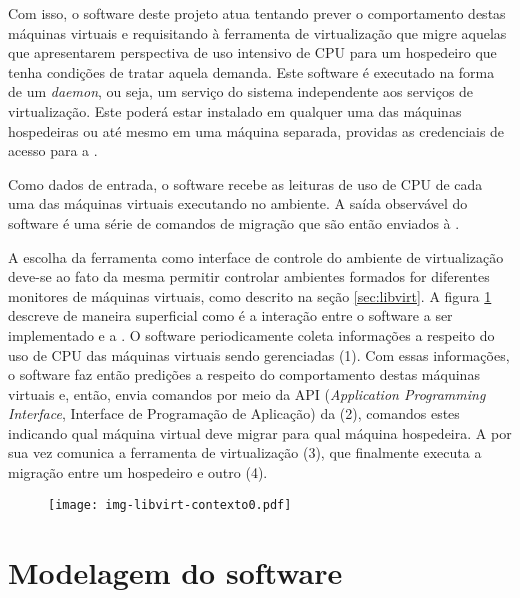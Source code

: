 Com isso, o software deste projeto atua tentando prever o comportamento
destas máquinas virtuais e requisitando à ferramenta de virtualização que
migre aquelas que apresentarem perspectiva de uso intensivo de CPU para um
hospedeiro que tenha condições de tratar aquela demanda. Este software é
executado na forma de um \emph{daemon}, ou seja, um serviço do sistema
independente aos serviços de virtualização. Este poderá estar instalado em
qualquer uma das máquinas hospedeiras ou até mesmo em uma máquina separada,
providas as credenciais de acesso para a \libvirt{}.

Como dados de entrada, o software recebe as leituras de uso de CPU de cada
uma das máquinas virtuais executando no ambiente. A saída observável do
software é uma série de comandos de migração que são então enviados à
\libvirt{}.

A escolha da ferramenta \libvirt{} como interface de controle do ambiente
de virtualização deve-se ao fato da mesma permitir controlar ambientes
formados for diferentes monitores de máquinas virtuais, como descrito na
seção \ref{sec:libvirt}. A figura \ref{fig:libvirtcontexto0} descreve de maneira
superficial como é a interação entre o software a ser implementado e a
\libvirt{}. O software periodicamente coleta informações a respeito
do uso de CPU das máquinas virtuais sendo gerenciadas (1). Com essas
informações, o software faz então predições a respeito do comportamento destas
máquinas virtuais e, então, envia comandos por meio da API (\emph{Application
Programming Interface}, Interface de Programação de Aplicação) da \libvirt{}
(2), comandos estes indicando qual máquina virtual deve migrar para qual
máquina hospedeira. A \libvirt{} por sua vez comunica a ferramenta de
virtualização (3), que finalmente executa a migração entre um hospedeiro e
outro (4).

\begin{figure}[htp]
\centering
\texttt{[image: img-libvirt-contexto0.pdf]}
\label{fig:libvirtcontexto0}
\end{figure}


\section{Modelagem do software}\label{sec:modelagem}


